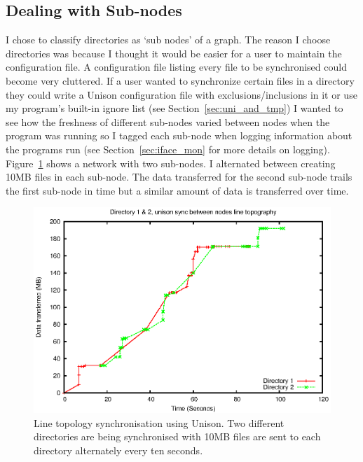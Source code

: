 \documentclass[12pt]{article}
\begin{document}
\subsection{Dealing with Sub-nodes}
\label{sec:subnodes}
I chose to classify directories as `sub nodes' of a graph. 
The reason I choose directories was because I thought it
would be easier for a user to maintain the configuration file.
A configuration file listing every file to be synchronised could
become very cluttered.
If a user wanted to synchronize
certain files in a directory they could write a Unison configuration file with 
exclusions/inclusions in it or use my program's built-in ignore
list (see Section~\ref{sec:uni_and_tmp})
I wanted to see how the freshness of different
sub-nodes varied between nodes when the program was running so I tagged
each sub-node when logging information about the programs run 
(see Section~\ref{sec:iface_mon} for more
details on logging). Figure~\ref{fig:line_uni_2dir_comb_graph}
shows a network with two sub-nodes. I alternated between creating
10MB files in each sub-node. The data transferred for the second
sub-node trails the first sub-node in time but a similar amount
of data is transferred over time.

\begin{figure}[htp]
    \centering
    \includegraphics[width=1\textwidth]{images/line-uni-dir-comb.eps}
    \caption{Line topology synchronisation using Unison. Two different directories are being synchronised with 10MB files are sent to each directory alternately every
    ten seconds.}
    \label{fig:line_uni_2dir_comb_graph}
\end{figure}
\newpage
\end{document}
